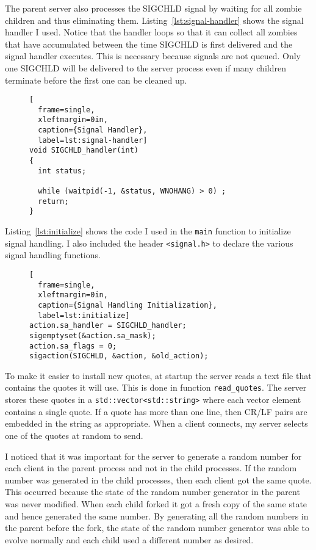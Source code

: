 \documentclass{article}
\newcommand{\code}[1]{\texttt{#1}}
\begin{document}
The parent server also processes the SIGCHLD signal by waiting for all zombie children and thus
eliminating them. Listing~\ref{lst:signal-handler} shows the signal handler I used. Notice that
the handler loops so that it can collect all zombies that have accumulated between the time
SIGCHLD is first delivered and the signal handler executes. This is necessary because signals
are not queued. Only one SIGCHLD will be delivered to the server process even if many children
terminate before the first one can be cleaned up.

\begin{figure}[tbhp]
\begin{lstlisting}[
  frame=single,
  xleftmargin=0in,
  caption={Signal Handler},
  label=lst:signal-handler]
void SIGCHLD_handler(int)
{
  int status;

  while (waitpid(-1, &status, WNOHANG) > 0) ;
  return;
}
\end{lstlisting}    
\end{figure}

Listing~\ref{lst:initialize} shows the code I used in the \code{main} function to initialize
signal handling. I also included the header \code{<signal.h>} to declare the various signal
handling functions.

\begin{figure}[tbhp]
\begin{lstlisting}[
  frame=single,
  xleftmargin=0in,
  caption={Signal Handling Initialization},
  label=lst:initialize]
action.sa_handler = SIGCHLD_handler;
sigemptyset(&action.sa_mask);
action.sa_flags = 0;
sigaction(SIGCHLD, &action, &old_action);
\end{lstlisting}    
\end{figure}

To make it easier to install new quotes, at startup the server reads a text file that contains
the quotes it will use. This is done in function \code{read\_quotes}. The server stores these
quotes in a \code{std::vector<std::string>} where each vector element contains a single quote.
If a quote has more than one line, then CR/LF pairs are embedded in the string as appropriate.
When a client connects, my server selects one of the quotes at random to send.

I noticed that it was important for the server to generate a random number for each client in
the parent process and not in the child processes. If the random number was generated in the
child processes, then each client got the same quote. This occurred because the state of the
random number generator in the parent was never modified. When each child forked it got a fresh
copy of the same state and hence generated the same number. By generating all the random numbers
in the parent before the fork, the state of the random number generator was able to evolve
normally and each child used a different number as desired.
\end{document}
